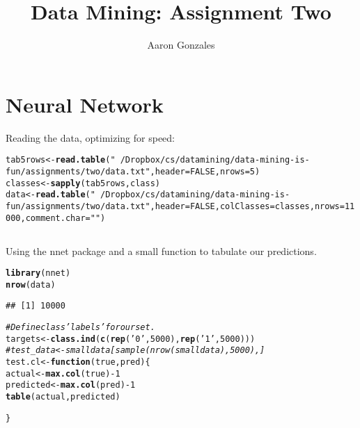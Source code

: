 \documentclass[titlepage]{article}\usepackage[]{graphicx}\usepackage[]{color}
\makeatletter
\newcommand{\hlnum}[1]{\textcolor[rgb]{0.686,0.059,0.569}{#1}}%
\newcommand{\hlstr}[1]{\textcolor[rgb]{0.192,0.494,0.8}{#1}}%
\newcommand{\hlcom}[1]{\textcolor[rgb]{0.678,0.584,0.686}{\textit{#1}}}%
\newcommand{\hlopt}[1]{\textcolor[rgb]{0,0,0}{#1}}%
\newcommand{\hlstd}[1]{\textcolor[rgb]{0.345,0.345,0.345}{#1}}%
\newcommand{\hlkwa}[1]{\textcolor[rgb]{0.161,0.373,0.58}{\textbf{#1}}}%
\newcommand{\hlkwb}[1]{\textcolor[rgb]{0.69,0.353,0.396}{#1}}%
\newcommand{\hlkwc}[1]{\textcolor[rgb]{0.333,0.667,0.333}{#1}}%
\newcommand{\hlkwd}[1]{\textcolor[rgb]{0.737,0.353,0.396}{\textbf{#1}}}%
\newenvironment{kframe}{%
 \def\at@end@of@kframe{}%
 \ifinner\ifhmode%
  \def\at@end@of@kframe{\end{minipage}}%
  \begin{minipage}{\columnwidth}%
 \fi\fi%
 \def\FrameCommand##1{\hskip\@totalleftmargin \hskip-\fboxsep
 \colorbox{shadecolor}{##1}\hskip-\fboxsep
     \hskip-\linewidth \hskip-\@totalleftmargin \hskip\columnwidth}%
 \MakeFramed {\advance\hsize-\width
   \@totalleftmargin\z@ \linewidth\hsize
   \@setminipage}}%
 {\par\unskip\endMakeFramed%
 \at@end@of@kframe}
\newenvironment{knitrout}{}{} %
\makeatother
\begin{document}
\title{Data Mining: Assignment Two}
\author{Aaron Gonzales}
\maketitle





\section{Neural Network}

Reading the data, optimizing for speed:
\begin{knitrout}
\color{fgcolor}\begin{kframe}
\begin{alltt}
\hlstd{tab5rows} \hlkwb{<-} \hlkwd{read.table}\hlstd{(}\hlstr{"~/Dropbox/cs/datamining/data-mining-is-fun/assignments/two/data.txt"}\hlstd{,} \hlkwc{header} \hlstd{=} \hlnum{FALSE}\hlstd{,} \hlkwc{nrows} \hlstd{=} \hlnum{5}\hlstd{)}
\hlstd{classes} \hlkwb{<-} \hlkwd{sapply}\hlstd{(tab5rows, class)}
\hlstd{data} \hlkwb{<-} \hlkwd{read.table}\hlstd{(}\hlstr{"~/Dropbox/cs/datamining/data-mining-is-fun/assignments/two/data.txt"}\hlstd{,} \hlkwc{header} \hlstd{=} \hlnum{FALSE}\hlstd{,} \hlkwc{colClasses} \hlstd{= classes,} \hlkwc{nrows} \hlstd{=} \hlnum{11000}\hlstd{,} \hlkwc{comment.char}\hlstd{=}\hlstr{""}\hlstd{)}
\end{alltt}
\end{kframe}
\end{knitrout}

\subsection {}

Using the nnet package and a small function to tabulate our predictions.
\begin{knitrout}
\color{fgcolor}\begin{kframe}
\begin{alltt}
\hlkwd{library}\hlstd{(nnet)}
\hlkwd{nrow}\hlstd{(data)}
\end{alltt}
\begin{verbatim}
## [1] 10000
\end{verbatim}
\begin{alltt}
\hlcom{#Define class 'labels' for our set.}
\hlstd{targets} \hlkwb{<-} \hlkwd{class.ind}\hlstd{(}\hlkwd{c}\hlstd{(}\hlkwd{rep}\hlstd{(}\hlstr{'0'}\hlstd{,} \hlnum{5000}\hlstd{),} \hlkwd{rep}\hlstd{(}\hlstr{'1'}\hlstd{,}\hlnum{5000}\hlstd{)))}
\hlcom{#test_data <- smalldata[sample(nrow(smalldata), 5000),]}
\hlstd{test.cl} \hlkwb{<-} \hlkwa{function}\hlstd{(}\hlkwc{true}\hlstd{,} \hlkwc{pred}\hlstd{) \{}
    \hlstd{actual} \hlkwb{<-} \hlkwd{max.col}\hlstd{(true)} \hlopt{-} \hlnum{1}
    \hlstd{predicted} \hlkwb{<-} \hlkwd{max.col}\hlstd{(pred)} \hlopt{-} \hlnum{1}
    \hlkwd{table}\hlstd{(actual, predicted)}

\hlstd{\}}
\end{alltt}
\end{kframe}
\end{knitrout}
\end{document}
